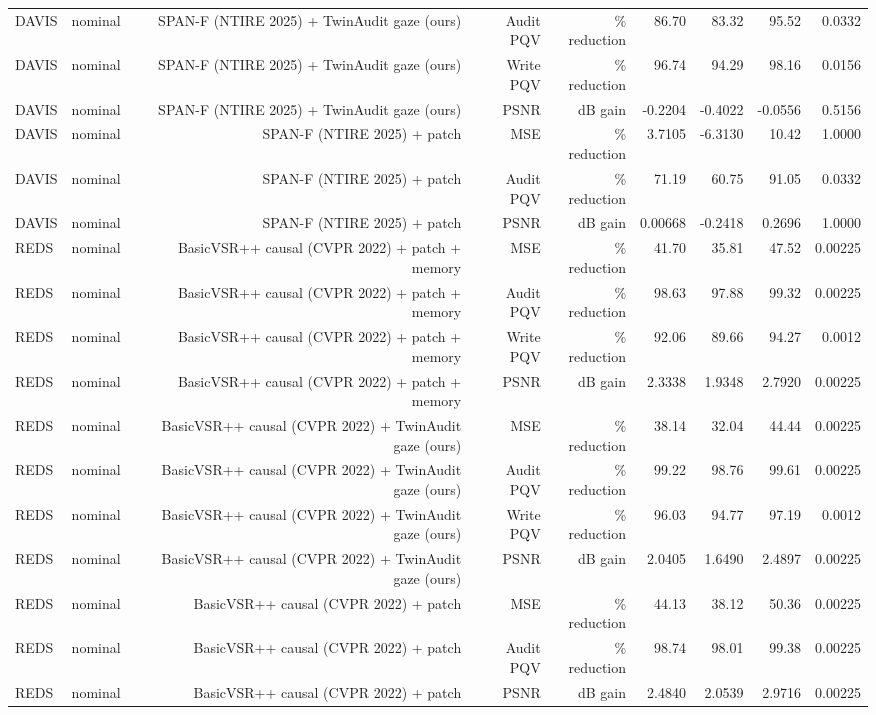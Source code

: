 \begin{table}[t]
\begin{tabular}{llrrrrrrr}
DAVIS & nominal & SPAN-F (NTIRE 2025) + TwinAudit gaze (ours) & Audit PQV & \% reduction & 86.70 & 83.32 & 95.52 & 0.0332 \\
DAVIS & nominal & SPAN-F (NTIRE 2025) + TwinAudit gaze (ours) & Write PQV & \% reduction & 96.74 & 94.29 & 98.16 & 0.0156 \\
DAVIS & nominal & SPAN-F (NTIRE 2025) + TwinAudit gaze (ours) & PSNR & dB gain & -0.2204 & -0.4022 & -0.0556 & 0.5156 \\
DAVIS & nominal & SPAN-F (NTIRE 2025) + patch & MSE & \% reduction & 3.7105 & -6.3130 & 10.42 & 1.0000 \\
DAVIS & nominal & SPAN-F (NTIRE 2025) + patch & Audit PQV & \% reduction & 71.19 & 60.75 & 91.05 & 0.0332 \\
DAVIS & nominal & SPAN-F (NTIRE 2025) + patch & PSNR & dB gain & 0.00668 & -0.2418 & 0.2696 & 1.0000 \\
REDS & nominal & BasicVSR++ causal (CVPR 2022) + patch + memory & MSE & \% reduction & 41.70 & 35.81 & 47.52 & 0.00225 \\
REDS & nominal & BasicVSR++ causal (CVPR 2022) + patch + memory & Audit PQV & \% reduction & 98.63 & 97.88 & 99.32 & 0.00225 \\
REDS & nominal & BasicVSR++ causal (CVPR 2022) + patch + memory & Write PQV & \% reduction & 92.06 & 89.66 & 94.27 & 0.0012 \\
REDS & nominal & BasicVSR++ causal (CVPR 2022) + patch + memory & PSNR & dB gain & 2.3338 & 1.9348 & 2.7920 & 0.00225 \\
REDS & nominal & BasicVSR++ causal (CVPR 2022) + TwinAudit gaze (ours) & MSE & \% reduction & 38.14 & 32.04 & 44.44 & 0.00225 \\
REDS & nominal & BasicVSR++ causal (CVPR 2022) + TwinAudit gaze (ours) & Audit PQV & \% reduction & 99.22 & 98.76 & 99.61 & 0.00225 \\
REDS & nominal & BasicVSR++ causal (CVPR 2022) + TwinAudit gaze (ours) & Write PQV & \% reduction & 96.03 & 94.77 & 97.19 & 0.0012 \\
REDS & nominal & BasicVSR++ causal (CVPR 2022) + TwinAudit gaze (ours) & PSNR & dB gain & 2.0405 & 1.6490 & 2.4897 & 0.00225 \\
REDS & nominal & BasicVSR++ causal (CVPR 2022) + patch & MSE & \% reduction & 44.13 & 38.12 & 50.36 & 0.00225 \\
REDS & nominal & BasicVSR++ causal (CVPR 2022) + patch & Audit PQV & \% reduction & 98.74 & 98.01 & 99.38 & 0.00225 \\
REDS & nominal & BasicVSR++ causal (CVPR 2022) + patch & PSNR & dB gain & 2.4840 & 2.0539 & 2.9716 & 0.00225 \\

\end{tabular}
\end{table}
